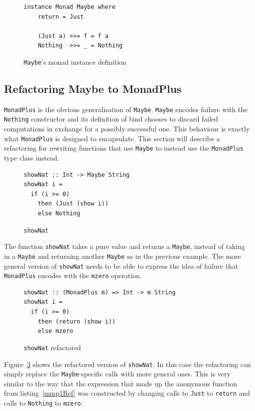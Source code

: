 \begin{figure}[t]
\begin{lstlisting}   
instance Monad Maybe where
	return = Just
	
	(Just a) >>= f = f a
	Nothing  >>= _ = Nothing
\end{lstlisting}
\caption{\texttt{Maybe}'s monad instance definition}
\label{maybeMonad}
\end{figure}

\subsection{Refactoring Maybe to MonadPlus} 

\texttt{MonadPlus} is the obvious generalisation of \texttt{Maybe}. \texttt{Maybe} encodes failure with the \texttt{Nothing} constructor and its definition of bind chooses to discard failed computations in exchange for a possibly successful one. This behaviour is exactly what \texttt{MonadPlus} is designed to encapsulate. This section will describe a refactoring for rewriting functions that use \texttt{Maybe} to instead use the \texttt{MonadPlus} type class instead.

\begin{figure}[t]
\begin{lstlisting}
showNat :: Int -> Maybe String
showNat i =
  if (i >= 0)
    then (Just (show i))
    else Nothing
\end{lstlisting}
\caption{\texttt{showNat}}
\label{mmp2}
\end{figure}

The function \texttt{showNat} takes a pure value and returns a \texttt{Maybe}, instead of taking in a \texttt{Maybe} and returning another \texttt{Maybe} as in the previous example. The more general version of \texttt{showNat} needs to be able to express the idea of failure that \texttt{MonadPlus} encodes with the \texttt{mzero} operation. 

\begin{figure}[t]
\begin{lstlisting}
showNat :: (MonadPlus m) => Int -> m String
showNat i =
  if (i >= 0)
    then (return (show i))
    else mzero
\end{lstlisting}
\caption{\texttt{showNat} refactored}
\label{mmp2Ref}
\end{figure} 
 
Figure~\ref{mmp2Ref} shows the refactored version of \texttt{showNat}. In this case the refactoring can simply replace the \texttt{Maybe}-specific calls with more general ones. This is very similar to the way that the expression that made up the anonymous function from listing~\ref{mmp1Ref} was constructed by changing calls to \texttt{Just} to \texttt{return} and calls to \texttt{Nothing} to \texttt{mzero}. 

